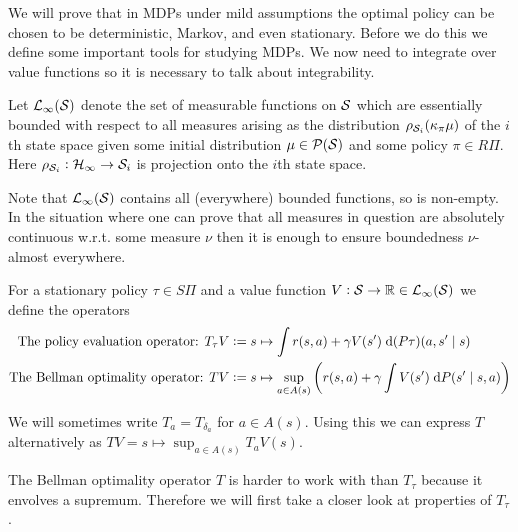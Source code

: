 We will prove that in MDPs under mild assumptions the optimal policy
can be chosen to be deterministic, Markov, and even stationary.
Before we do this we define some important tools for studying MDPs.
We now need to integrate over value functions so it is
necessary to talk about integrability.

\begin{defn}
  Let $\mathcal{L}_\infty(\mathcal{S})$ denote the set of
  measurable functions on $\mathcal{S}$ which are
  essentially bounded with respect to all measures
  arising as the distribution $\rho_{\mathcal{S}_i}(\kappa_\pi \mu)$
  of the $i$th state space given some initial
  distribution $\mu \in \mathcal{P}(\mathcal{S})$ and some policy $\pi \in R\Pi$.
  Here $\rho_{\mathcal{S}_i} : \mathcal{H}_\infty \to \mathcal{S}_i$ is projection
  onto the $i$th state space.
\end{defn}
\begin{rem}
  Note that $\mathcal{L}_\infty(\mathcal{S})$ contains all (everywhere) bounded
  functions, so is non-empty.
  In the situation where one can prove that all
  measures in question are absolutely continuous w.r.t. some measure
  $\nu$ then it is enough to ensure boundedness $\nu$-almost everywhere.
\end{rem}

\begin{defn}
  For a stationary policy $\tau \in S\Pi$ and a value function
  $V:\mathcal{S} \to \mathbb{R} \in \mathcal{L}_\infty(\mathcal{S})$
  we define the operators 
  \begin{align*}
    \text{The policy evaluation operator: }
    T_\tau V & \vcentcolon= s \mapsto \int r(s, a)
    + \gamma V(s') \; \mathrm{d} (P \tau)(a, s'\mid s)
    \\ \text{The Bellman optimality operator: }
    T V & \vcentcolon= s \mapsto 
    \sup_{a \in A(s)} \left(r(s, a) + \gamma \int V(s')
    \; \mathrm{d} P(s' \mid s, a) \right)
  \end{align*}
\end{defn}
\begin{rem}
  We will sometimes write $T_a = T_{\delta_a}$ for $a \in A(s)$.
  Using this we can express $T$ alternatively as
  $TV = s \mapsto \sup_{a \in A(s)} T_a V(s)$.
\end{rem}

The Bellman optimality operator $T$
is harder to work with than $T_\tau$ because it envolves a supremum.
Therefore we will first take a closer look at properties of $T_\tau$.


